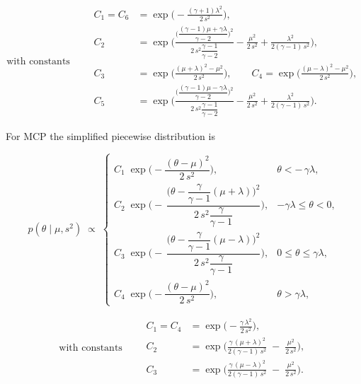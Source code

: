 \[
\text{with constants}\qquad
\begin{aligned}
C_{1} = C_{6}
&= \exp\!\Big(-\frac{(\gamma+1)\lambda^2}{2\,s^2}\Big),\\[1ex]
C_{2}
&= \exp\!\Bigg(
    \frac{\displaystyle \Big(\dfrac{(\gamma-1)\mu + \gamma\lambda}{\gamma-2}\Big)^{\!2}}
         {2\,s^2 \dfrac{\gamma-1}{\gamma-2}}
    - \frac{\mu^2}{2\,s^2}
    + \frac{\lambda^2}{2(\gamma-1)\,s^2}
  \Bigg),\\[2ex]
C_{3}
&= \exp\!\Big(\frac{(\mu+\lambda)^2 - \mu^2}{2\,s^2}\Big),\qquad
C_{4}
= \exp\!\Big(\frac{(\mu-\lambda)^2 - \mu^2}{2\,s^2}\Big),\\[1ex]
C_{5}
&= \exp\!\Bigg(
    \frac{\displaystyle \Big(\dfrac{(\gamma-1)\mu - \gamma\lambda}{\gamma-2}\Big)^{\!2}}
         {2\,s^2 \dfrac{\gamma-1}{\gamma-2}}
    - \frac{\mu^2}{2\,s^2}
    + \frac{\lambda^2}{2(\gamma-1)\,s^2}
  \Bigg).
\end{aligned}
\]

\noindent For MCP the simplified piecewise distribution is

\[
p(\theta \mid \mu, s^2)
\;\propto\;
\begin{cases}
  C_{1}\;
  \exp\!\Big(-\dfrac{(\theta-\mu)^2}{2\,s^2}\Big),
  & \theta < -\,\gamma\lambda,\\[2.0ex]

  C_{2}\;
  \exp\!\Bigg(
    -\,\dfrac{\Big(\theta - \dfrac{\gamma}{\gamma-1}(\mu+\lambda)\Big)^{\!2}}
             {2\,s^2 \dfrac{\gamma}{\gamma-1}}
  \Bigg),
  & -\gamma\lambda \le \theta < 0,\\[3.0ex]

  C_{3}\;
  \exp\!\Bigg(
    -\,\dfrac{\Big(\theta - \dfrac{\gamma}{\gamma-1}(\mu-\lambda)\Big)^{\!2}}
             {2\,s^2 \dfrac{\gamma}{\gamma-1}}
  \Bigg),
  & 0 \le \theta \le \gamma\lambda,\\[3.0ex]

  C_{4}\;
  \exp\!\Big(-\dfrac{(\theta-\mu)^2}{2\,s^2}\Big),
  & \theta > \gamma\lambda,
\end{cases}
\]

\[
\text{with constants}\qquad
\begin{aligned}
C_{1} = C_4
&= \exp\!\Big(-\frac{\gamma\,\lambda^2}{2\,s^2}\Big),\\[1.0ex]
C_{2}
&= \exp\!\Big(\frac{\gamma\,(\mu+\lambda)^2}{2(\gamma-1)\,s^2}\;-\;\frac{\mu^2}{2\,s^2}\Big),\\[1.0ex]
C_{3}
&= \exp\!\Big(\frac{\gamma\,(\mu-\lambda)^2}{2(\gamma-1)\,s^2}\;-\;\frac{\mu^2}{2\,s^2}\Big).
\end{aligned}
\]

